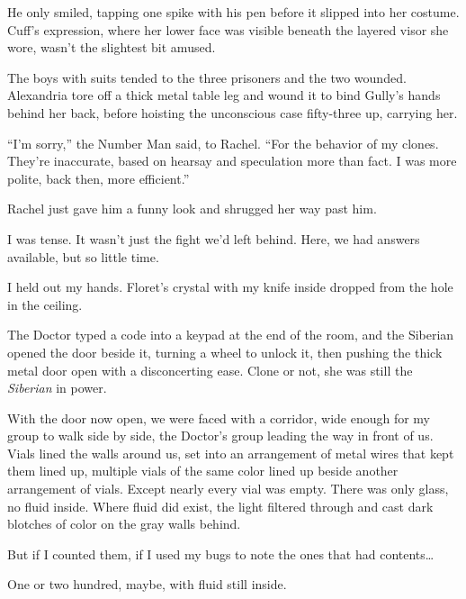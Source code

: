 He only smiled, tapping one spike with his pen before it slipped into her costume.  Cuff's expression, where her lower face was visible beneath the layered visor she wore, wasn't the slightest bit amused.



The boys with suits tended to the three prisoners and the two wounded.  Alexandria tore off a thick metal table leg and wound it to bind Gully's hands behind her back, before hoisting the unconscious case fifty-three up, carrying her.



``I'm sorry,'' the Number Man said, to Rachel.  ``For the behavior of my clones.  They're inaccurate, based on hearsay and speculation more than fact.  I was more polite, back then, more efficient.''



Rachel just gave him a funny look and shrugged her way past him.



I was tense.  It wasn't just the fight we'd left behind.  Here, we had answers available, but so little time.



I held out my hands.  Floret's crystal with my knife inside dropped from the hole in the ceiling.



The Doctor typed a code into a keypad at the end of the room, and the Siberian opened the door beside it, turning a wheel to unlock it, then pushing the thick metal door open with a disconcerting ease.  Clone or not, she was still the \emph{Siberian} in power.



With the door now open, we were faced with a corridor, wide enough for my group to walk side by side, the Doctor's group leading the way in front of us.  Vials lined the walls around us, set into an arrangement of metal wires that kept them lined up, multiple vials of the same color lined up beside another arrangement of vials.  Except nearly every vial was empty.  There was only glass, no fluid inside.  Where fluid did exist, the light filtered through and cast dark blotches of color on the gray walls behind.



But if I counted them, if I used my bugs to note the ones that had contents\ldots



One or two hundred, maybe, with fluid still inside.




